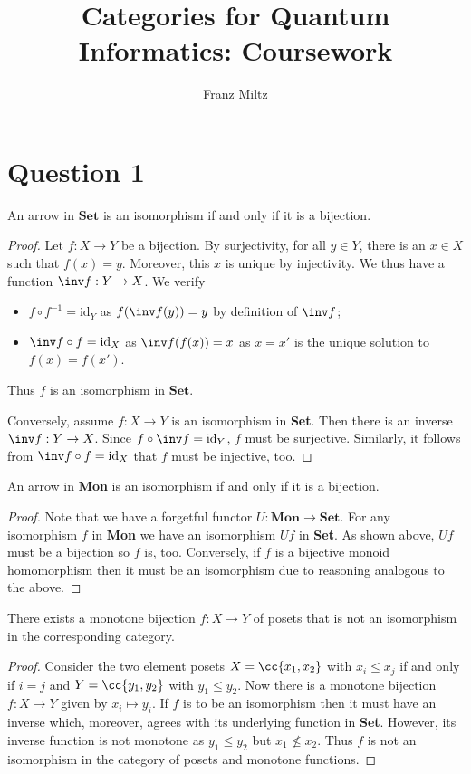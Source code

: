 \documentclass{article}
\title{Categories for Quantum Informatics: Coursework}
\author{Franz Miltz}
\begin{document}
\maketitle

\section*{Question 1}

\begin{claim*}[a]
  An arrow in $\textbf{Set}$ is an isomorphism if and only if it is a bijection.
  \begin{proof}
    Let $f:X\to Y$ be a bijection. By surjectivity, for all $y\in Y$, there is an $x\in X$
    such that $f(x)=y$. Moreover, this $x$ is unique by injectivity. We thus have a function
    $\inv f : Y\to X$. We verify
    \begin{itemize}
      \item $f\circ f^{-1}=\text{id}_Y$ as $f(\inv f(y)) = y$ by definition of $\inv f$;
      \item $\inv f\circ f=\text{id}_X$ as $\inv f(f(x)) = x$ as $x=x'$ is the unique
        solution to $f(x)=f(x')$.
    \end{itemize}
    Thus $f$ is an isomorphism in $\textbf{Set}$.

    Conversely, assume $f:X\to Y$ is an isomorphism in \textbf{Set}. Then there is an
    inverse $\inv f:Y\to X$. Since $f\circ \inv f=\text{id}_Y$, $f$ must be surjective.
    Similarly, it follows from $\inv f\circ f=\text{id}_X$ that $f$ must be injective, too.
  \end{proof}
\end{claim*}

\begin{claim*}[b]
  An arrow in \textbf{Mon} is an isomorphism if and only if it is a bijection.
  \begin{proof}
    Note that we have a forgetful functor $U:\textbf{Mon}\to\textbf{Set}$. For any
    isomorphism $f$ in \textbf{Mon} we have an isomorphism $Uf$ in \textbf{Set}. As
    shown above, $Uf$ must be a bijection so $f$ is, too. Conversely, if $f$ is a
    bijective monoid homomorphism then it must be an isomorphism due to reasoning
    analogous to the above.
  \end{proof}
\end{claim*}

\begin{claim*}[c]
  There exists a monotone bijection $f:X\to Y$ of posets that is not an isomorphism in the corresponding
  category.
  \begin{proof}
    Consider the two element posets $X=\cc{x_1,x_2}$ with $x_i\leq x_j$ if and only if $i=j$
    and $Y=\cc{y_1,y_2}$ with $y_1\leq y_2$. Now there is a monotone bijection
    $f:X\to Y$ given by $x_i\mapsto y_i$. If $f$ is to be an isomorphism then it must have
    an inverse which, moreover, agrees with its underlying function in \textbf{Set}.
    However, its inverse function is not monotone as $y_1\leq y_2$
    but $x_1\not\leq x_2$. Thus $f$ is not an isomorphism in the category of posets and
    monotone functions.
  \end{proof}
\end{claim*}
\end{document}
